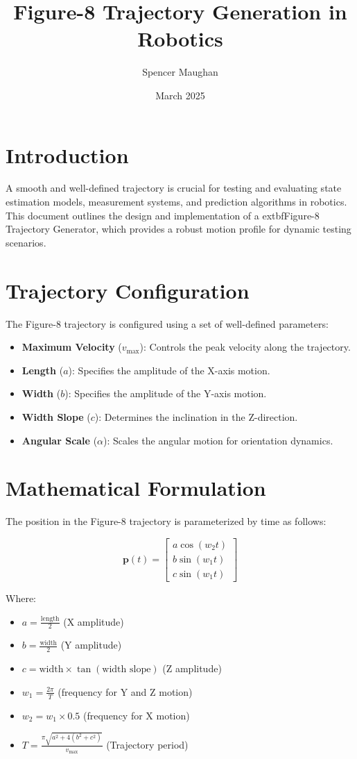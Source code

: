 \documentclass{article}
\title{Figure-8 Trajectory Generation in Robotics}
\author{Spencer Maughan}
\date{March 2025}
\begin{document}
	\maketitle

	\section{Introduction}
	A smooth and well-defined trajectory is crucial for testing and evaluating state estimation models, measurement systems, and prediction algorithms in robotics. This document outlines the design and implementation of a 	extbf{Figure-8 Trajectory Generator}, which provides a robust motion profile for dynamic testing scenarios.

	\section{Trajectory Configuration}
	The Figure-8 trajectory is configured using a set of well-defined parameters:

	\begin{itemize}
		\item \textbf{Maximum Velocity} ($v_{\text{max}}$): Controls the peak velocity along the trajectory.
		\item \textbf{Length} ($a$): Specifies the amplitude of the X-axis motion.
		\item \textbf{Width} ($b$): Specifies the amplitude of the Y-axis motion.
		\item \textbf{Width Slope} ($c$): Determines the inclination in the Z-direction.
		\item \textbf{Angular Scale} ($\alpha$): Scales the angular motion for orientation dynamics.
	\end{itemize}

	\section{Mathematical Formulation}
	The position in the Figure-8 trajectory is parameterized by time as follows:

	\[ \mathbf{p}(t) =
	\begin{bmatrix}
		a \cos(w_2 t) \\
		b \sin(w_1 t) \\
		c \sin(w_1 t)
	\end{bmatrix}
	\]

	Where:
	\begin{itemize}
		\item $a = \frac{\text{length}}{2}$ (X amplitude)
		\item $b = \frac{\text{width}}{2}$ (Y amplitude)
		\item $c = \text{width} \times \tan(\text{width slope})$ (Z amplitude)
		\item $w_1 = \frac{2\pi}{T}$ (frequency for Y and Z motion)
		\item $w_2 = w_1 \times 0.5$ (frequency for X motion)
		\item $T = \frac{\pi \sqrt{a^2 + 4(b^2 + c^2)}}{v_{\text{max}}}$ (Trajectory period)
	\end{itemize}
\end{document}
